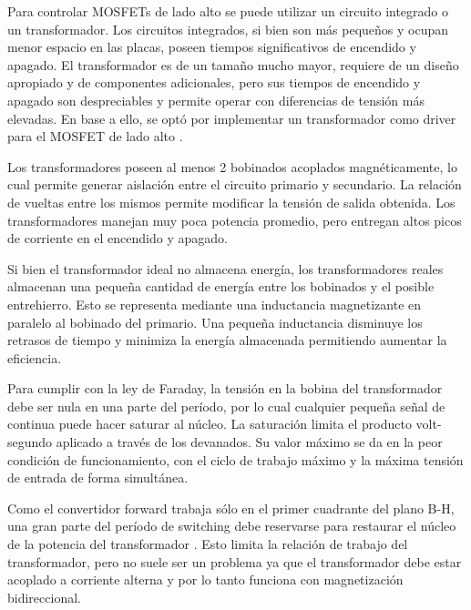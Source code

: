 Para controlar MOSFETs de lado alto se puede utilizar un circuito integrado o un transformador. 
Los circuitos integrados, si bien son más pequeños y ocupan menor espacio en las placas, 
poseen tiempos significativos de encendido y apagado. 
El transformador es de un tamaño mucho mayor, requiere de un diseño apropiado y de componentes adicionales,
pero sus tiempos de encendido y apagado son despreciables y permite operar con diferencias de tensión más elevadas.
En base a ello, se optó por implementar un transformador como driver para el MOSFET de lado alto \cite{gatedrivers}. 

Los transformadores poseen al menos 2 bobinados acoplados magnéticamente, 
lo cual permite generar aislación entre el circuito primario y secundario. 
La relación de vueltas entre los mismos permite modificar la tensión de salida obtenida. 
Los transformadores manejan muy poca potencia promedio, pero entregan altos picos de corriente en el encendido y apagado.

Si bien el transformador ideal no almacena energía, los transformadores reales 
almacenan una pequeña cantidad de energía entre los bobinados y el posible entrehierro. 
Esto se representa mediante una inductancia magnetizante en paralelo al bobinado del primario. 
Una pequeña inductancia disminuye los retrasos de tiempo y minimiza la energía almacenada permitiendo aumentar la eficiencia. 

Para cumplir con la ley de Faraday, la tensión en la bobina del transformador debe ser nula en una parte del período, 
por lo cual cualquier pequeña señal de continua puede hacer saturar al núcleo. 
La saturación limita el producto volt-segundo aplicado a través de los devanados. 
Su valor máximo se da en la peor condición de funcionamiento, con el ciclo de trabajo máximo y la máxima tensión de entrada de forma simultánea. 

Como el convertidor forward trabaja sólo en el primer cuadrante del plano B-H, una gran parte del período de switching debe reservarse para restaurar el núcleo de la potencia del transformador \cite{hart_espanol}.
Esto limita la relación de trabajo del transformador, pero no suele ser un problema ya que 
el transformador debe estar acoplado a corriente alterna y por lo tanto funciona con magnetización bidireccional.

